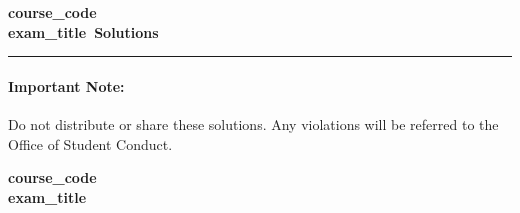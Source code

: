 \documentclass[11pt]{article}
\newif\ifsolutions
\newcommand{\coursecode}{{{course_code}}}
\newcommand{\examtitle}{{{exam_title}}}
\begin{document}
\thispagestyle{empty}
\ifsolutions
\begin{center}
\Large\bf\coursecode\\[2pt] \examtitle ~Solutions \\ \large\docdate
\end{center}

\hrule
\paragraph{Important Note:} Do not distribute or share these solutions. Any violations will be referred to the Office of Student Conduct.
\else 
\begin{center}
\Large\bf\coursecode\\[2pt] \examtitle \\
\end{center}
\end{document}
